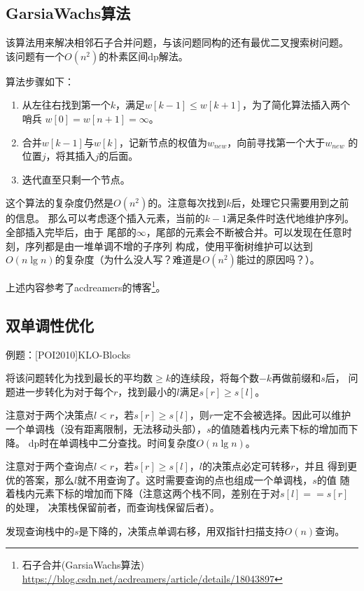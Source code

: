 \subsection{GarsiaWachs算法}
该算法用来解决相邻石子合并问题，与该问题同构的还有最优二叉搜索树问题。
该问题有一个$O(n^2)$的朴素区间dp解法。

算法步骤如下：
\begin{enumerate}
    \item 从左往右找到第一个$k$，满足$w[k-1] \leq w[k+1]$，为了简化算法插入两个哨兵
    $w[0]=w[n+1]=\infty$。
    \item 合并$w[k-1]$与$w[k]$，记新节点的权值为$w_{new}$，向前寻找第一个大于$w_{new}$
    的位置$j$，将其插入$j$的后面。
    \item 迭代直至只剩一个节点。
\end{enumerate}

这个算法的复杂度仍然是$O(n^2)$的。注意每次找到$k$后，处理它只需要用到之前的信息。
那么可以考虑逐个插入元素，当前的$k-1$满足条件时迭代地维护序列。全部插入完毕后，由于
尾部的$\infty$，尾部的元素会不断被合并。可以发现在任意时刻，序列都是由一堆单调不增的子序列
构成，使用平衡树维护可以达到$O(n\lg n)$的复杂度（为什么没人写？难道是$O(n^2)$能过的原因吗？）。


上述内容参考了acdreamers的博客\footnote{
    石子合并(GarsiaWachs算法)\\
    \url{https://blog.csdn.net/acdreamers/article/details/18043897}
}。
\subsection{双单调性优化}
例题：[POI2010]KLO-Blocks

将该问题转化为找到最长的平均数$\geq k$的连续段，将每个数$-k$再做前缀和$s$后，
问题进一步转化为对于每个$r$，找到最小的$l$满足$s[r]\geq s[l]$。

注意对于两个决策点$l<r$，若$s[r]\geq s[l]$，则$r$一定不会被选择。因此可以维护
一个单调栈（没有距离限制，无法移动头部），$s$的值随着栈内元素下标的增加而下降。
dp时在单调栈中二分查找。时间复杂度$O(n\lg n)$。

注意对于两个查询点$l<r$，若$s[r]\geq s[l]$，$l$的决策点必定可转移$r$，并且
得到更优的答案，那么$l$就不用查询了。这时需要查询的点也组成一个单调栈，$s$的值
随着栈内元素下标的增加而下降（注意这两个栈不同，差别在于对$s[l]==s[r]$的处理，
决策栈保留前者，而查询栈保留后者）。

发现查询栈中的$s$是下降的，决策点单调右移，用双指针扫描支持$O(n)$查询。

